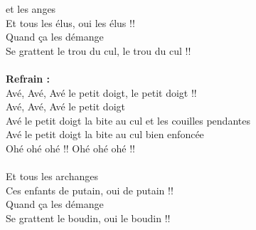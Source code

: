 
 et les anges
\\Et tous les élus, oui les élus !!
\\Quand ça les démange
\\Se grattent le trou du cul, le trou du cul !!
\\\\\textbf{Refrain :}
\\Avé, Avé, Avé le petit doigt, le petit doigt !!
\\Avé, Avé, Avé le petit doigt
\\Avé le petit doigt la bite au cul et les couilles pendantes
\\Avé le petit doigt la bite au cul bien enfoncée
\\Ohé ohé ohé !! Ohé ohé ohé !!
\\\\Et tous les archanges
\\Ces enfants de putain, oui de putain !!
\\Quand ça les démange
\\Se grattent le boudin, oui le boudin !!

\breakpage